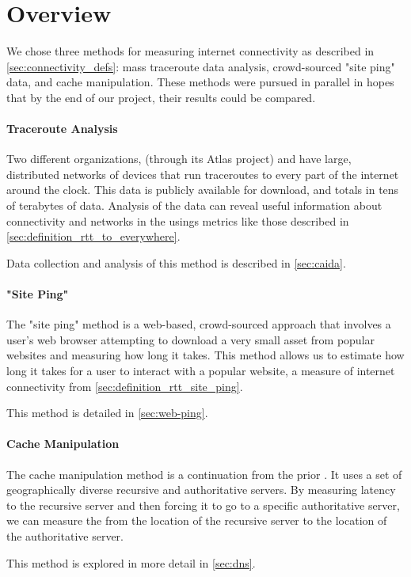 \section{Overview}\label{sec:methods_overview}

We chose three methods for measuring internet connectivity as described in \cref{sec:connectivity_defs}: mass traceroute data analysis, crowd-sourced "site ping" data, and \dns cache manipulation. These methods were pursued in parallel in hopes that by the end of our project, their results could be compared.


\paragraph{Traceroute Analysis} Two different organizations, \ripe (through its Atlas project) and \caida have large, distributed networks of devices that run traceroutes to every part of the internet around the clock. This data is publicly available for download, and totals in tens of terabytes of data. Analysis of the data can reveal useful information about connectivity and networks in the \us usings metrics like those described in \cref{sec:definition_rtt_to_everywhere}.

Data collection and analysis of this method is described in \cref{sec:caida}.

\paragraph{"Site Ping"} The "site ping" method is a web-based, crowd-sourced approach that involves a user's web browser attempting to download a very small asset from popular websites and measuring how long it takes. This method allows us to estimate how long it takes for a user to interact with a popular website, a measure of internet connectivity from \cref{sec:definition_rtt_site_ping}.

This method is detailed in \cref{sec:web-ping}.

\paragraph{\DNS Cache Manipulation} The \dns cache manipulation method is a continuation from the prior \mqp \cite{Fakult2019}. It uses a set of geographically diverse recursive and authoritative \dns servers. By measuring latency to the recursive \dns server and then forcing it to go to a specific authoritative server, we can measure the \rtt from the location of the recursive server to the location of the authoritative server. 

This method is explored in more detail in \cref{sec:dns}.